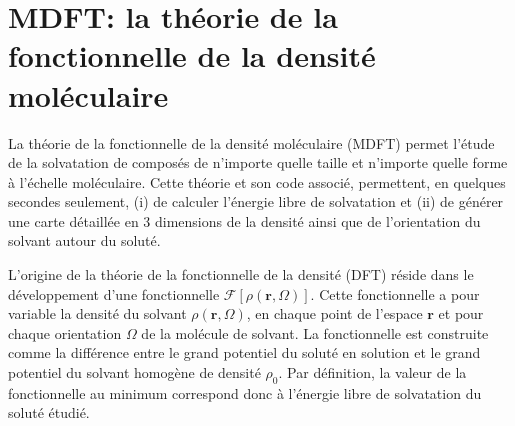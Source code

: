 \chapter{MDFT: la théorie de la fonctionnelle de la densité moléculaire}
\label{chap:theorie}



La théorie de la fonctionnelle de la densité moléculaire (MDFT) permet l'étude de la solvatation de composés de n'importe quelle taille et n'importe quelle forme à l'échelle moléculaire. Cette théorie et son code associé, permettent, en quelques secondes seulement, (i) de calculer l'énergie libre de solvatation et (ii) de générer une carte détaillée en 3 dimensions de la densité ainsi que de l'orientation du solvant autour du soluté.


L'origine de la théorie de la fonctionnelle de la densité (DFT) réside dans le développement d'une fonctionnelle $\mathcal{F}[\rho\left(\boldsymbol{r},\Omega \right)]$. Cette fonctionnelle a pour variable la densité du solvant $\rho\left(\boldsymbol{r},\Omega \right)$, en chaque point de l'espace $\boldsymbol{r}$ et pour chaque orientation $\Omega$ de la molécule de solvant. La fonctionnelle est construite comme la différence entre le grand potentiel du soluté en solution et le grand potentiel du solvant homogène de densité $\rho_{0}$. Par définition, la valeur de la fonctionnelle au minimum correspond donc à l'énergie libre de solvatation du soluté étudié. 

